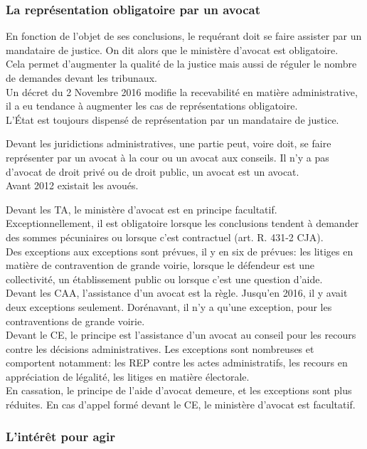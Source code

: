 \documentclass[10pt, a4paper, openany]{book}
\begin{document}
\subsubsection{La représentation obligatoire par un avocat}

En fonction de l'objet de ses conclusions, le requérant doit se faire assister par un mandataire de justice. On dit alors que le ministère d'avocat est obligatoire. \\
Cela permet d'augmenter la qualité de la justice mais aussi de réguler le nombre de demandes devant les tribunaux. \\
Un décret du 2 Novembre 2016 modifie la recevabilité en matière administrative, il a eu tendance à augmenter les cas de représentations obligatoire. \\
L'État est toujours dispensé de représentation par un mandataire de justice. 


Devant les juridictions administratives, une partie peut, voire doit, se faire représenter par un avocat à la cour ou un avocat aux conseils. Il n'y a pas d'avocat de droit privé ou de droit public, un avocat est un avocat. \\
Avant 2012 existait les avoués.


Devant les TA, le ministère d'avocat est en principe facultatif. Exceptionnellement, il est obligatoire lorsque les conclusions tendent à demander des sommes pécuniaires ou lorsque c'est contractuel (art. R. 431-2 CJA). \\
Des exceptions aux exceptions sont prévues, il y en six de prévues: les litiges en matière de contravention de grande voirie, lorsque le défendeur est une collectivité, un établissement public ou lorsque c'est une question d'aide. \\
Devant les CAA, l'assistance d'un avocat est la règle. Jusqu'en 2016, il y avait deux exceptions seulement. Dorénavant, il n'y a qu'une exception, pour les contraventions de grande voirie. \\
Devant le CE, le principe est l'assistance d'un avocat au conseil pour les recours contre les décisions administratives. Les exceptions sont nombreuses et comportent notamment: les REP contre les actes administratifs, les recours en appréciation de légalité, les litiges en matière électorale. \\
En cassation, le principe de l'aide d'avocat demeure, et les exceptions sont plus réduites. En cas d'appel formé devant le CE, le ministère d'avocat est facultatif. 

\subsubsection{L'intérêt pour agir}
\end{document}
